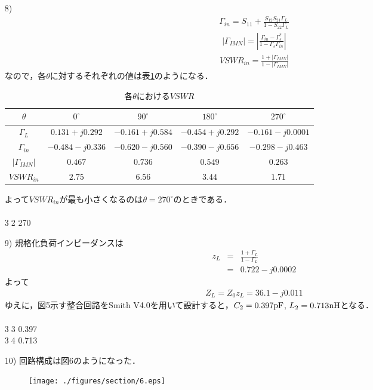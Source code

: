 \begin{itemize}
    \item[8)]
    \begin{eqnarray*}
        \Gamma_{in}=S_{11}+\frac{S_{12}S_{21}\Gamma_L}{1-S_{22}\Gamma_L}
    \end{eqnarray*}
    \begin{eqnarray*}
        |\Gamma_{IMN}|=|\frac{\Gamma_{in}-\Gamma^*_s}{1-\Gamma_s\Gamma_{in}}|
    \end{eqnarray*}
    \begin{eqnarray*}
        VSWR_{in}=\frac{1+|\Gamma_{IMN}|}{1-|\Gamma_{IMN}|}
    \end{eqnarray*}
    なので，各$\theta$に対するそれぞれの値は表\ref{tab:VSMR}のようになる．
    \begin{table}[H]
        \begin{center}
            \begin{tabular}{c|cccc}
                \hline
                $\theta$ & $0^\circ$ & $90^\circ$ & $180^\circ$ & $270^\circ$\\
                \hline \hline
                $\Gamma_L$ & $0.131+j0.292$ & $-0.161+j0.584$ & $-0.454+j0.292$ & $-0.161-j0.0001$\\
                $\Gamma_{in}$ & $-0.484-j0.336$ & $-0.620-j0.560$ & $-0.390-j0.656$ & $-0.298-j0.463$\\
                $|\Gamma_{IMN}|$ & $0.467$ & $0.736$ & $0.549$ & $0.263$\\
                $VSWR_{in}$ & $2.75$ & $6.56$ & $3.44$ & $1.71$\\
                \hline
            \end{tabular}
            \caption{各$\theta$における$VSWR$}
            \label{tab:VSMR}
        \end{center}
    \end{table}
    よって$VSWR_{in}$が最も小さくなるのは$\theta=270^\circ$のときである．\\
    \\
    \textcircled{\scriptsize32} 270

    \item[9)]
    規格化負荷インピーダンスは
    \begin{eqnarray*}
        z_L&=&\frac{1+\Gamma_L}{1-\Gamma_L}\\
        &=&0.722-j0.0002
    \end{eqnarray*}
    よって
    \begin{eqnarray*}
        Z_L=Z_0z_L=36.1-j0.011
    \end{eqnarray*}
    ゆえに，図5示す整合回路をSmith V4.0を用いて設計すると，$C_2=0.397{\rm pF}$, $L_2=0.713{\rm nH}$となる．\\
    \\
    \textcircled{\scriptsize33} 0.397\\
    \textcircled{\scriptsize34} 0.713

    \item[10)]
    回路構成は図6のようになった．
    \setcounter{figure}{5}
    \begin{figure}[H]
        \begin{center}
            \texttt{[image: ./figures/section/6.eps]}
            \caption{}
        \end{center}
    \end{figure}
\end{itemize}